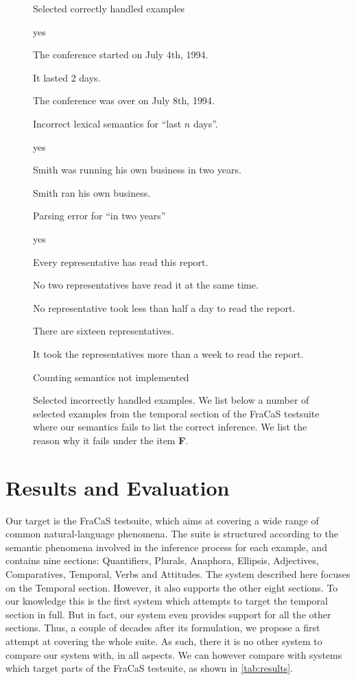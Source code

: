 \documentclass[a4paper,twoside]{article}
\newcommand\hyp{\item[H]}
\newcommand\answer{\item[A]}
\newcommand\failsf{\item[F]}
\newcommand\fracasex[2]{\begin{lingex}\item[(#1)] \begin{subex} #2 \end{subex} \end{lingex} }
\begin{document}
\begin{figure*}
\begin{subfigure}{0.5\textwidth}
  \caption{Selected correctly handled examples}
  \label{fig:correct-examples}
\end{subfigure}
\begin{subfigure}{0.5\textwidth}
{
} \fracasex{259	}{\answer yes
\item	The conference started on July 4th, 1994.
\item	It lasted 2 days.
\hyp    The conference was over on July 8th, 1994.
\failsf Incorrect lexical semantics for ``last $n$ days''.
} \fracasex{294	}{\answer yes
\item	Smith was running his own business in two years.
\hyp    Smith ran his own business.
\failsf Parsing error for ``in two years''
} \fracasex{317	}{\answer yes
\item	Every representative has read this report.
\item	No two representatives have read it at the same time.
\item	No representative took less than half a day to read the report.
\item	There are sixteen representatives.
\hyp    It took the representatives more than a week to read the report.
\failsf Counting semantics not implemented
}
  \caption{Selected incorrectly handled examples.
  We list below a number of selected examples from the temporal section
of the FraCaS testsuite where our semantics fails to list the correct
inference. We list the reason why it fails under the item \textbf{F}.
}
  \label{fig:incorrect-examples}
\end{subfigure}
\end{figure*}

\section{Results and Evaluation}
\label{sec:results}
Our target is the FraCaS testsuite, which aims at covering a wide
range of common natural-language phenomena. 
%
The suite is structured according to the semantic phenomena involved
in the inference process for each example, and contains nine sections:
Quantifiers, Plurals, Anaphora, Ellipsis, Adjectives, Comparatives,
Temporal, Verbs and Attitudes.  The system described here focuses on
the Temporal section. However, it also supports the other eight
sections.  To our knowledge this is the first system which attempts to
target the temporal section in full. But in fact, our system even provides
support for all the other sections. Thus, a couple of decades after its
formulation, we propose a first attempt at covering the whole suite.
As such, there it is no other system to compare our system with, in
all aspects.  We can however compare with systems which target parts
of the FraCaS testsuite, as shown in \cref{tab:results}.
\end{document}
